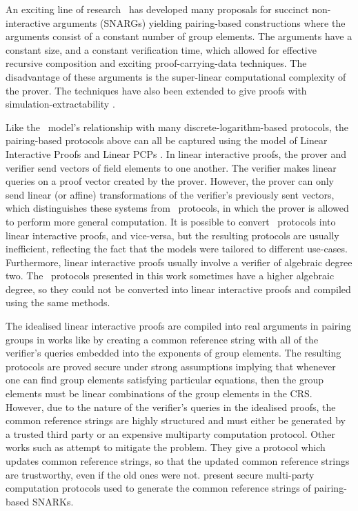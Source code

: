 An exciting line of research~\cite{Groth2010b,Lip12,Bitansky2012,Gennaro2013,Bitansky2013,PHGR13, C:BCGTV13,BCTV14} has developed many proposals for succinct non-interactive arguments (SNARGs) yielding pairing-based constructions where the arguments consist of a constant number of group elements. The arguments have a constant size, and a constant verification time, which allowed for effective recursive composition \cite{Bitansky2013} and exciting proof-carrying-data techniques. The disadvantage of these arguments is the super-linear computational complexity of the prover. The techniques have also been extended to give proofs with simulation-extractability \cite{GrothM17,BoweG18}.

Like the \ILC\ model's relationship with many discrete-logarithm-based protocols, the pairing-based protocols above can all be captured using the model of Linear Interactive Proofs and Linear PCPs \cite{BitanskyCIPO13}. In linear interactive proofs, the prover and verifier send vectors of field elements to one another. The verifier makes linear queries on a proof vector created by the prover. However, the prover can only send linear (or affine) transformations of the verifier's previously sent vectors, which distinguishes these systems from \ILC\ protocols, in which the prover is allowed to perform more general computation. It is possible to convert \ILC\ protocols into linear interactive proofs, and vice-versa, but the resulting protocols are usually inefficient, reflecting the fact that the models were tailored to different use-cases. Furthermore, linear interactive proofs usually involve a verifier of algebraic degree two. The \ILC\ protocols presented in this work sometimes have a higher algebraic degree, so they could not be converted into linear interactive proofs and compiled using the same methods.

The idealised linear interactive proofs are compiled into real arguments in pairing groups in works like \cite{BCTV14} by creating a common reference string with all of the verifier's queries embedded into the exponents of group elements.
The resulting protocols are proved secure under strong assumptions implying that whenever one can find group elements satisfying particular equations, then the group elements must be linear combinations of the group elements in the CRS.
However, due to the nature of the verifier's queries in the idealised proofs, the common reference strings are highly structured and must either be generated by a trusted third party or an expensive multiparty computation protocol. Other works such as \cite{GrothKMMM18} attempt to mitigate the problem. They give a protocol which updates common reference strings, so that the updated common reference strings are trustworthy, even if the old ones were not. \cite{Ben-SassonC0TV15,BoweGG17} present secure multi-party computation protocols used to generate the common reference strings of pairing-based SNARKs.


